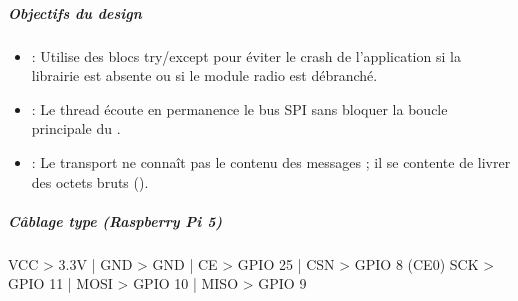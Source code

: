 \documentclass[letterpaper,10pt,french]{sphinxmanual}
\begin{document}
\subparagraph{Objectifs du design}
\label{\detokenize{api/hardware.transports:objectifs-du-design}}\begin{itemize}
\item {} 
\sphinxAtStartPar
{} : Utilise des blocs try/except pour éviter le crash de l’application
si la librairie  est absente ou si le module radio est débranché.

\item {} 
\sphinxAtStartPar
{} : Le thread  écoute en permanence le bus SPI sans
bloquer la boucle principale du .

\item {} 
\sphinxAtStartPar
{} : Le transport ne connaît pas le contenu des messages ; il se
contente de livrer des octets bruts ().

\end{itemize}


\subparagraph{Câblage type (Raspberry Pi 5)}
\label{\detokenize{api/hardware.transports:cablage-type-raspberry-pi-5}}
\sphinxAtStartPar
VCC \sphinxhyphen{}\textgreater{} 3.3V | GND \sphinxhyphen{}\textgreater{} GND | CE \sphinxhyphen{}\textgreater{} GPIO 25 | CSN \sphinxhyphen{}\textgreater{} GPIO 8 (CE0)
SCK \sphinxhyphen{}\textgreater{} GPIO 11 | MOSI \sphinxhyphen{}\textgreater{} GPIO 10 | MISO \sphinxhyphen{}\textgreater{} GPIO 9
\end{document}
